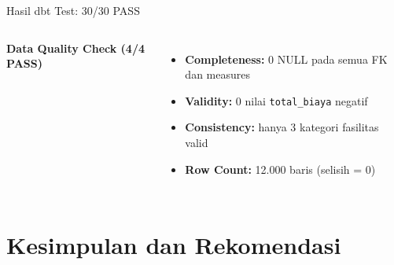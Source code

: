 \documentclass[xcolor=table,t,aspectratio=169]{beamer}
\begin{document}
\begin{frame}{Hasil dbt Test: 30/30 PASS}
  \footnotesize
  \begin{columns}[T]
    \vspace{4pt}
    \textbf{Data Quality Check (4/4 PASS)}
    \begin{itemize}
      \scriptsize
      \item \textbf{Completeness:} 0 NULL pada semua FK dan measures
      \item \textbf{Validity:} 0 nilai \texttt{total\_biaya} negatif
      \item \textbf{Consistency:} hanya 3 kategori fasilitas valid
      \item \textbf{Row Count:} 12.000 baris (selisih = 0)
    \end{itemize}
  \end{columns}
\end{frame}
\section{Kesimpulan dan Rekomendasi}
\end{document}
